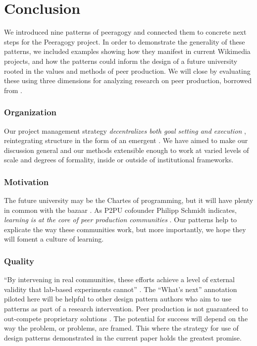 \section{Conclusion}\label{sec:Conclusion}

We introduced nine patterns of peeragogy and connected them to
concrete next steps for the Peeragogy project.  In order to
demonstrate the generality of these patterns, we included examples
showing how they manifest in current Wikimedia projects, and 
how the patterns could inform the design of a future university rooted in the
values and methods of peer production.
%
We will close by evaluating these using
three dimensions for analyzing research on peer production, borrowed
from \cite{benkler2015peer}.

\vspace{-.25\baselineskip}

\subsubsection*{Organization} 
Our project management strategy \emph{decentralizes both goal setting
  and execution} \cite{benkler2015peer}, reintegrating structure in
the form of an emergent .  We have aimed to make
our discussion general and our methods extensible enough to work at
varied levels of scale and degrees of formality, inside or outside of
institutional frameworks.

\vspace{-.25\baselineskip}

\subsubsection*{Motivation}  The future university may be
the Chartes of programming, but it will have plenty in common with the
bazaar \cite{raymond2001cathedral}.  As P2PU cofounder Philipp Schmidt
indicates, \emph{learning is at the core of peer production
  communities} \cite{schmidt+commons-based+2009}.  Our patterns help
to explicate the way these communities work, but more importantly,
we hope they will foment a culture of learning.

\vspace{-.25\baselineskip}

\subsubsection*{Quality} 
``By intervening in real communities, these efforts achieve a level of
external validity that lab-based experiments cannot''
\cite{benkler2015peer}.  The ``What's next'' annotation piloted here
will be helpful to other design pattern authors who aim to use
patterns as part of a research intervention.  Peer production is not guaranteed to
  out-compete proprietary solutions
\cite{benkler2015peer,free-software-better}.  The potential for
success will depend on the way the problem, or problems, are framed.
This where the strategy for use of design patterns demonstrated in the
current paper holds the greatest promise.

